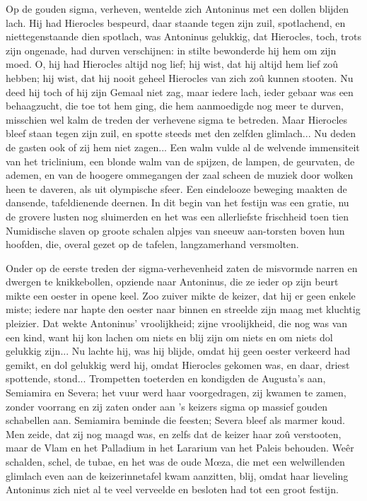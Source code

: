 \documentclass[a4paper, 12pt, oneside, dutch]{article}
\begin{document}
Op de gouden sigma, verheven, wentelde zich Antoninus met een dollen blijden lach. Hij had Hierocles bespeurd, daar staande tegen zijn zuil, spotlachend, en niettegenstaande dien spotlach, was Antoninus gelukkig, dat Hierocles, toch, trots zijn ongenade, had durven verschijnen: in stilte bewonderde hij hem om zijn moed. O, hij had Hierocles altijd nog lief; hij wist, dat hij altijd hem lief zoû hebben; hij wist, dat hij nooit geheel Hierocles van zich zoû kunnen stooten. Nu deed hij toch of hij zijn Gemaal niet zag, maar iedere lach, ieder gebaar was een behaagzucht, die toe tot hem ging, die hem aanmoedigde nog meer te durven, misschien wel kalm de treden der verhevene sigma te betreden. Maar Hierocles bleef staan tegen zijn zuil, en spotte steeds met den zelfden glimlach... Nu deden de gasten ook of zij hem niet zagen... Een walm vulde al de welvende immensiteit van het triclinium, een blonde walm van de spijzen, de lampen, de geurvaten, de ademen, en van de hoogere ommegangen der zaal scheen de muziek door wolken heen te daveren, als uit olympische sfeer. Een eindelooze beweging maakten de dansende, tafeldienende deernen. In dit begin van het festijn was een gratie, nu de grovere lusten nog sluimerden en het was een allerliefste frischheid toen tien Numidische slaven op groote schalen alpjes van sneeuw aan-torsten boven hun hoofden, die, overal gezet op de tafelen, langzamerhand versmolten.

Onder op de eerste treden der sigma-verhevenheid zaten de misvormde narren en dwergen te knikkebollen, opziende naar Antoninus, die ze ieder op zijn beurt mikte een oester in opene keel. Zoo zuiver mikte de keizer, dat hij er geen enkele miste; iedere nar hapte den oester naar binnen en streelde zijn maag met kluchtig pleizier. Dat wekte Antoninus' vroolijkheid; zijne vroolijkheid, die nog was van een kind, want hij kon lachen om niets en blij zijn om niets en om niets dol gelukkig zijn... Nu lachte hij, was hij blijde, omdat hij geen oester verkeerd had gemikt, en dol gelukkig werd hij, omdat Hierocles gekomen was, en daar, driest spottende, stond... Trompetten toeterden en kondigden de Augusta's aan, Semiamira en Severa; het vuur werd haar voorgedragen, zij kwamen te zamen, zonder voorrang en zij zaten onder aan 's keizers sigma op massief gouden schabellen aan. Semiamira beminde die feesten; Severa bleef als marmer koud. Men zeide, dat zij nog maagd was, en zelfs dat de keizer haar zoû verstooten, maar de Vlam en het Palladium in het Lararium van het Paleis behouden. Weêr schalden, schel, de tubae, en het was de oude Mœza, die met een welwillenden glimlach even aan de keizerinnetafel kwam aanzitten, blij, omdat haar lieveling Antoninus zich niet al te veel verveelde en besloten had tot een groot festijn.
\end{document}
